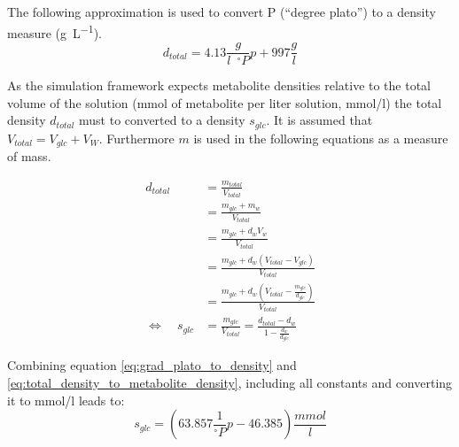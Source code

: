 \appendices
\section{}\label{ap:super_fancy_stuff}
The following approximation is used to convert \textdegree P (``degree plato'') to a density measure (\si{\gram\per\liter})\cite{bubnik1995sugar}.
\begin{equation} \label{eq:grad_plato_to_density}
 d_{total} = 4.13 \frac{g}{l \,\,\, ^\circ P} p + 997 \frac{g}{l}
\end{equation}

As the simulation framework expects metabolite densities relative to the total volume of the solution (mmol of metabolite per liter
solution, mmol/l) the total density $d_{total}$ must to converted to a density $s_{glc}$.
It is assumed that $V_{total} = V_{glc} + V_W$. Furthermore $m$ is used in the following equations as a measure of mass.

\begin{align}\label{eq:total_density_to_metabolite_density}
 d_{total} & = \frac{m_{total}}{V_{total}} \nonumber \\
           & = \frac{m_{glc} + m_w}{V_{total}} \nonumber \\
           & = \frac{m_{glc} + d_w V_w}{V_{total}} \nonumber \\
           & = \frac{m_{glc} + d_w \left(V_{total} - V_{glc}\right)}{V_{total}} \nonumber \\
           & = \frac{m_{glc} + d_w \left(V_{total} - \frac{m_{glc}}{d_{glc}}\right)}{V_{total}} \nonumber \\
 \Leftrightarrow \quad s_{glc}   & = \frac{m_{glc}}{V_{total}} = \frac{d_{total} - d_w}{1 - \frac{d_w}{d_{glc}}}
\end{align}

Combining equation \ref{eq:grad_plato_to_density} and \ref{eq:total_density_to_metabolite_density}, including all constants and converting it to mmol/l leads to:
\begin{equation} \label{eq:ready_to_use_plato_to_metabolite_density}
 s_{glc} = \left( 63.857 \frac{1}{^\circ P} p - 46.385 \right) \frac{mmol}{l}
\end{equation}




